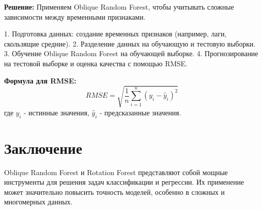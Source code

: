 \textbf{Решение:}
Применяем Oblique Random Forest, чтобы учитывать сложные зависимости между временными признаками.

1. Подготовка данных: создание временных признаков (например, лаги, скользящие средние).
2. Разделение данных на обучающую и тестовую выборки.
3. Обучение Oblique Random Forest на обучающей выборке.
4. Прогнозирование на тестовой выборке и оценка качества с помощью RMSE.

\textbf{Формула для RMSE:}
\[
    RMSE = \sqrt{\frac{1}{n} \sum_{i=1}^{n} (y_i - \hat{y}_i)^2}
\]
где \(y_i\) - истинные значения, \(\hat{y}_i\) - предсказанные значения.

\section{Заключение}
Oblique Random Forest и Rotation Forest представляют собой мощные инструменты для решения задач классификации и регрессии. Их применение может значительно повысить точность моделей, особенно в сложных и многомерных данных.
